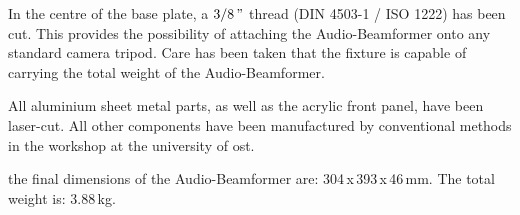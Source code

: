 In the centre of the base plate, a $3/8\,"$ thread (DIN 4503-1 / ISO 1222) has been cut. This provides the possibility of attaching the Audio-Beamformer onto any standard camera tripod. Care has been taken that the fixture is capable of carrying the total weight of the Audio-Beamformer.

All aluminium sheet metal parts, as well as the acrylic front panel, have been laser-cut. All other components have been manufactured by conventional methods in the workshop at the university of \acrshort{ost}.

the final dimensions of the Audio-Beamformer are: 304\,x\,393\,x\,46\,mm. The total weight is: 3.88\,kg.



